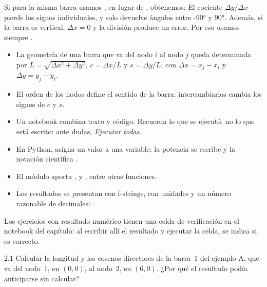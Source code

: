 \begin{cuidado}
Si para la misma barra usamos , en lugar de
, obtenemos:
El cociente $\Delta y/\Delta x$ pierde los signos individuales, y
 solo devuelve ángulos entre \ang{-90} y \ang{90}. Además, si la
barra es vertical, $\Delta x = 0$ y la división produce un error. Por eso
usamos siempre .
\end{cuidado}

\repasoyresumen

\begin{itemize}
  \item La geometría de una barra que va del nodo $i$ al nodo $j$ queda
    determinada por $L = \sqrt{\Delta x^2 + \Delta y^2}$,
    $c = \Delta x / L$ y $s = \Delta y / L$, con
    $\Delta x = x_j - x_i$ y $\Delta y = y_j - y_i$.
  \item El orden de los nodos define el sentido de la barra: intercambiarlos
    cambia los signos de $c$ y $s$.
  \item Un notebook combina texto y código. Recuerda lo que se ejecutó, no lo
    que está escrito: ante dudas, \emph{Ejecutar todas}.
  \item En Python, \py{=} asigna un valor a una variable; la potencia se
    escribe \py{**} y la notación científica .
  \item El módulo  aporta ,  y
    , entre otras funciones.
  \item Los resultados se presentan con f-strings, con unidades y un número
    razonable de decimales: .
\end{itemize}

\ejercicios

Los ejercicios con resultado numérico tienen una celda de verificación en el
notebook del capítulo: al escribir allí el resultado y ejecutar la celda, se
indica si es correcto. 

\begin{ejercicio}{2.1}
Calcular la longitud y los cosenos directores de la barra~1 del ejemplo A,
que va del nodo~1, en $(0, 0)$, al nodo~2, en $(6, 0)$. ¿Por qué el resultado
podía anticiparse sin calcular?
\end{ejercicio}

